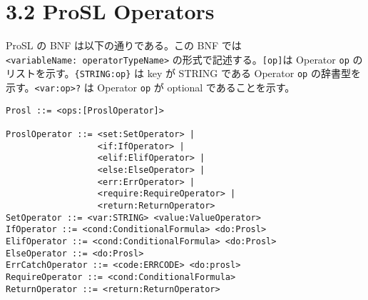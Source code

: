 \hypertarget{prosl-operators}{%
\section{3.2 ProSL Operators}\label{prosl-operators}}

ProSL の BNF は以下の通りである。この BNF では
\texttt{\textless{}variableName:\ operatorTypeName\textgreater{}}
の形式で記述する。\texttt{{[}op{]}}は Operator \texttt{op}
のリストを示す。\texttt{\{STRING:op\}} は key が STRING である Operator
\texttt{op} の辞書型を示す。\texttt{\textless{}var:op\textgreater{}?} は
Operator \texttt{op} が optional であることを示す。

\begin{verbatim}
Prosl ::= <ops:[ProslOperator]>

ProslOperator ::= <set:SetOperator> |
                  <if:IfOperator> |
                  <elif:ElifOperator> |
                  <else:ElseOperator> |
                  <err:ErrOperator> |
                  <require:RequireOperator> |
                  <return:ReturnOperator>
SetOperator ::= <var:STRING> <value:ValueOperator>
IfOperator ::= <cond:ConditionalFormula> <do:Prosl>
ElifOperator ::= <cond:ConditionalFormula> <do:Prosl>
ElseOperator ::= <do:Prosl>
ErrCatchOperator ::= <code:ERRCODE> <do:prosl>
RequireOperator ::= <cond:ConditionalFormula>
ReturnOperator ::= <return:ReturnOperator>


\end{verbatim}
